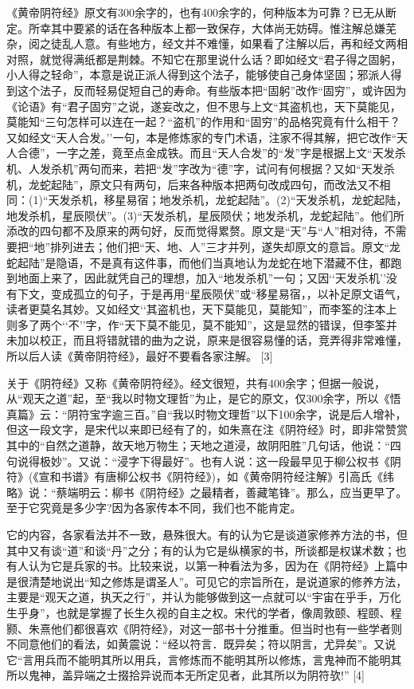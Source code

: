 \documentclass[12pt,UTF8]{ctexbook}
\begin{document}
《黄帝阴符经》原文有300余字的，也有400余字的，何种版本为可靠？已无从断定。所幸其中要紧的话在各种版本上都一致保存，大体尚无妨碍。惟注解总嫌芜杂，阅之徒乱人意。有些地方，经文并不难懂，如果看了注解以后，再和经文两相对照，就觉得满纸都是荆棘。不知它在那里说什么话？即如经文“君子得之固躬，小人得之轻命”，本意是说正派人得到这个法子，能够使自己身体坚固；邪派人得到这个法子，反而轻易促短自己的寿命。有些版本把“固躬”改作“固穷”，或许因为《论语》有“君子固穷”之说，遂妄改之，但不思与上文“其盗机也，天下莫能见，莫能知“三句怎样可以连在一起？“盗机”的作用和“固穷”的品格究竟有什么相干？又如经文“天人合发。’’一句，本是修炼家的专门术语，注家不得其解，把它改作“天人合德”，一字之差，竟至点金成铁。而且“天人合发”的“发”字是根据上文“天发杀机、人发杀机”两句而来，若把“发”字改为“德”字，试问有何根据？又如“天发杀机，龙蛇起陆”，原文只有两句，后来各种版本把两句改成四句，而改法又不相同：(1)“天发杀机，移星易宿；地发杀机，龙蛇起陆”。(2)“天发杀机，龙蛇起陆，地发杀机，星辰陨伏”。(3)“天发杀机，星辰陨伏；地发杀机，龙蛇起陆”。他们所添改的四句都不及原来的两句好，反而觉得累赘。原文是“天”与“人”相对待，不需要把“地”排列进去；他们把“天、地、人”三才并列，遂失却原文的意旨。原文“龙蛇起陆”是隐语，不是真有这件事，而他们当真地认为龙蛇在地下潜藏不住，都跑到地面上来了，因此就凭自己的理想，加入“地发杀机”一句；又因‘‘天发杀机’’没有下文，变成孤立的句子，于是再用“星辰陨伏”或“移星易宿，，以补足原文语气，读者更莫名其妙。又如经文‘‘其盗机也，天下莫能见，莫能知”，而李筌的注本上则多了两个‘‘不’’字，作“天下莫不能见，莫不能知”，这是显然的错误，但李筌并未加以校正，而且将错就错的曲为之说，原来是很容易懂的话，竞弄得非常难懂，所以后人读《黄帝阴符经》，最好不要看各家注解。 [3]

关于《阴符经》又称《黄帝阴符经》。经文很短，共有400余字；但据一般说，从“观天之道”起，至“我以时物文理哲”为止，是它的原文，仅300余字，所以《悟真篇》云：“阴符宝字逾三百。”自“我以时物文理哲”以下100余字，说是后人增补，但这一段文字，是宋代以来即已经有了的，如朱熹在注《阴符经》时，即非常赞赏其中的“自然之道静，故天地万物生；天地之道浸，故阴阳胜”几句话，他说：“四句说得极妙”。又说：“浸字下得最好”。也有人说：这一段最早见于柳公权书《阴符》(《宣和书谱》有唐柳公权书《阴符经》)，如《黄帝阴符经注解》引高氏《纬略》说：“蔡端明云：柳书《阴符经》之最精者，善藏笔锋”。那么，应当更早了。至于它究竟是多少字?因为各家传本不同，我们也不能肯定。

它的内容，各家看法并不一致，悬殊很大。有的认为它是谈道家修养方法的书，但其中又有谈“道”和谈“丹”之分；有的认为它是纵横家的书，所谈都是权谋术数；也有人认为它是兵家的书。比较来说，以第一种看法为多，因为在《阴符经》上篇中是很清楚地说出“知之修炼是谓圣人”。可见它的宗旨所在，是说道家的修养方法，主要是“观天之道，执天之行”，并认为能够做到这一点就可以“宇宙在乎手，万化生乎身”，也就是掌握了长生久视的自主之权。宋代的学者，像周敦颐、程颐、程颢、朱熹他们都很喜欢《阴符经》，对这一部书十分推重。但当时也有一些学者则不同意他们的看法，如黄震说：“经以符言．既异矣；符以阴言，尤异矣”。又说它“言用兵而不能明其所以用兵，言修炼而不能明其所以修炼，言鬼神而不能明其所以鬼神，盖异端之士掇拾异说而本无所定见者，此其所以为阴符欤!” [4]
\end{document}
